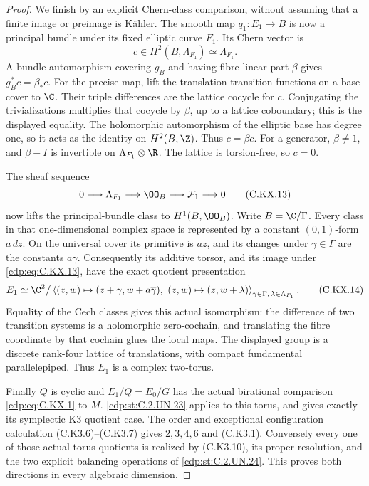 \begin{proof}
We finish by an
explicit Chern-class
comparison, without
assuming that a
finite image or
preimage is
K\"ahler.
The smooth map
$q_1:E_1\to B$
is now a principal
bundle under its
fixed elliptic
curve $F_1$.
Its Chern vector is
\[
        c\in H^2(B,\Lambda_{F_1})
                  \simeq\Lambda_{F_1}.
                                                               \tag{C.KX.12}\label{cdp:eq:C.KX.12}
\]
A bundle
automorphism
covering $g_B$
and having
fibre linear
part $\beta$
gives
$g_B^*c=\beta_*c$.
For the precise
map, lift the
translation
transition
functions on
a base cover
to $\C$.
Their triple
differences are
the lattice
cocycle for $c$.
Conjugating the
trivializations
multiplies that
cocycle by $\beta$,
up to a lattice
coboundary; this
is the displayed
equality.
The holomorphic
automorphism of
the elliptic
base has degree
one, so it acts
as the identity
on $H^2(B,\Z)$.
Thus $c=\beta c$.
For a generator,
$\beta\ne1$, and
$\beta-I$ is
invertible on
$\Lambda_{F_1}
\otimes\R$.
The lattice is
torsion-free, so
$c=0$.

The sheaf sequence
\[
 0\longrightarrow\Lambda_{F_1}
 \longrightarrow\OO_B
 \longrightarrow\mathcal F_1
 \longrightarrow0
                                                               \tag{C.KX.13}\label{cdp:eq:C.KX.13}
\]
now lifts the
principal-bundle
class to
$H^1(B,\OO_B)$.
Write $B=\C/\Gamma$.
Every class in
that one-dimensional
complex space
is represented
by a constant
$(0,1)$-form
$a\,d\overline z$.
On the universal
cover its
primitive is
$a\overline z$,
and its changes
under $\gamma\in\Gamma$
are the constants
$a\overline\gamma$.
Consequently its
additive torsor,
and its image
under \eqref{cdp:eq:C.KX.13},
have the exact
quotient presentation
\[
 E_1\simeq
 \C^2\big/
 \left\langle
 (z,w)\mapsto
       (z+\gamma,w+a\overline\gamma),\
 (z,w)\mapsto(z,w+\lambda)
 \right\rangle_{
       \gamma\in\Gamma,\,
       \lambda\in\Lambda_{F_1}} .
                                                               \tag{C.KX.14}\label{cdp:eq:C.KX.14}
\]
Equality of the
Cech classes gives
this actual
isomorphism:
the difference
of two transition
systems is a
holomorphic
zero-cochain,
and translating
the fibre
coordinate by
that cochain
glues the local
maps.
The displayed
group is a
discrete rank-four
lattice of
translations,
with compact
fundamental
parallelepiped.
Thus $E_1$
is a complex
two-torus.

Finally $Q$ is
cyclic and
$E_1/Q=E_0/G$
has the actual
birational
comparison
\eqref{cdp:eq:C.KX.1} to $M$.
\ref{cdp:st:C.2.UN.23} applies
to this torus,
and gives
exactly its
symplectic K3
quotient case.
The order and
exceptional
configuration
calculation
(C.K3.6)--(C.K3.7)
gives $2,3,4,6$
and (C.K3.1).
Conversely every
one of those
actual torus
quotients is
realized by
(C.K3.10), its
proper resolution,
and the two
explicit balancing
operations of
\ref{cdp:st:C.2.UN.24}. This
proves both
directions in
every algebraic
dimension.
\end{proof}



